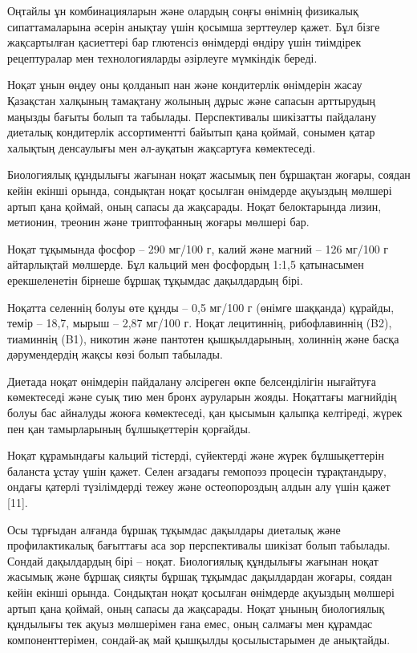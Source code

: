 \begin{multicols}{2}
Оңтайлы ұн комбинацияларын және олардың соңғы өнімнің физикалық
сипаттамаларына әсерін анықтау үшін қосымша зерттеулер қажет. Бұл бізге
жақсартылған қасиеттері бар глютенсіз өнімдерді өндіру үшін тиімдірек
рецептуралар мен технологияларды әзірлеуге мүмкіндік береді.

Ноқат ұнын өңдеу оны қолданып нан және кондитерлік өнімдерін жасау
Қазақстан халқының тамақтану жолының дұрыс және сапасын арттырудың
маңызды бағыты болып та табылады. Перспективалы шикізатты пайдалану
диеталық кондитерлік ассортиментті байытып қана қоймай, сонымен қатар
халықтың денсаулығы мен әл-ауқатын жақсартуға көмектеседі.

Биологиялық құндылығы жағынан ноқат жасымық пен бұршақтан жоғары, соядан
кейін екінші орында, сондықтан ноқат қосылған өнімдерде ақуыздың мөлшері
артып қана қоймай, оның сапасы да жақсарады. Ноқат белоктарында лизин,
метионин, треонин және триптофанның жоғары мөлшері бар.

Ноқат тұқымында фосфор -- 290 мг/100 г, калий және магний -- 126 мг/100
г айтарлықтай мөлшерде. Бұл кальций мен фосфордың 1:1,5 қатынасымен
ерекшеленетін бірнеше бұршақ тұқымдас дақылдардың бірі.

Ноқатта селеннің болуы өте құнды -- 0,5 мг/100 г (өнімге шаққанда)
құрайды, темір -- 18,7, мырыш -- 2,87 мг/100 г. Ноқат лецитиннің,
рибофлавиннің (B2), тиаминнің (B1), никотин және пантотен қышқылдарының,
холиннің және басқа дәрумендердің жақсы көзі болып табылады.

Диетада ноқат өнімдерін пайдалану әлсіреген өкпе белсенділігін нығайтуға
көмектеседі және суық тию мен бронх ауруларын жояды. Ноқаттағы магнийдің
болуы бас айналуды жоюға көмектеседі, қан қысымын қалыпқа келтіреді,
жүрек пен қан тамырларының бұлшықеттерін қорғайды.

Ноқат құрамындағы кальций тістерді, сүйектерді және жүрек бұлшықеттерін
баланста ұстау үшін қажет. Селен ағзадағы гемопоэз процесін
тұрақтандыру, ондағы қатерлі түзілімдерді тежеу және остеопороздың алдын
алу үшін қажет {[}11{]}.

Осы тұрғыдан алғанда бұршақ тұқымдас дақылдары диеталық және
профилактикалық бағыттағы аса зор перспективалы шикізат болып табылады.
Сондай дақылдардың бірі -- ноқат. Биологиялық құндылығы жағынан ноқат
жасымық және бұршақ сияқты бұршақ тұқымдас дақылдардан жоғары, соядан
кейін екінші орында. Сондықтан ноқат қосылған өнімдерде ақуыздың мөлшері
артып қана қоймай, оның сапасы да жақсарады. Ноқат ұнының биологиялық
құндылығы тек ақуыз мөлшерімен ғана емес, оның салмағы мен құрамдас
компоненттерімен, сондай-ақ май қышқылды қосылыстарымен де анықтайды.


\end{multicols}
